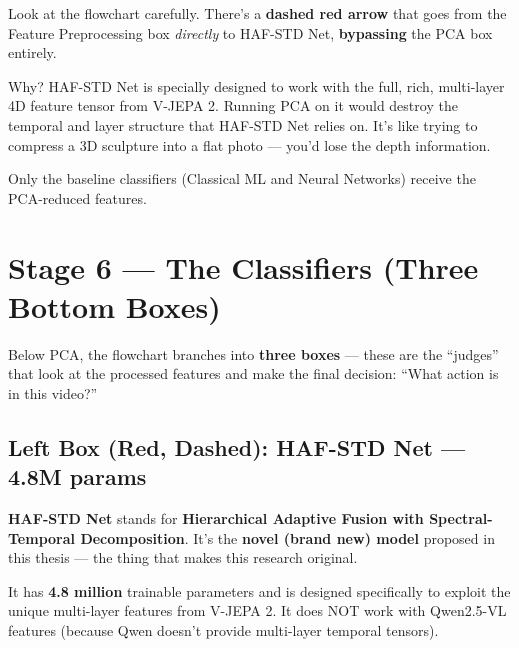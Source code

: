 \documentclass[12pt, a4paper]{article}
\begin{document}
\begin{warnbox}
Look at the flowchart carefully. There's a \textbf{dashed red arrow} that goes from the Feature Preprocessing box \textit{directly} to HAF-STD Net, \textbf{bypassing} the PCA box entirely. 

Why? HAF-STD Net is specially designed to work with the full, rich, multi-layer 4D feature tensor from V-JEPA 2. Running PCA on it would destroy the temporal and layer structure that HAF-STD Net relies on. It's like trying to compress a 3D sculpture into a flat photo — you'd lose the depth information.

Only the baseline classifiers (Classical ML and Neural Networks) receive the PCA-reduced features.
\end{warnbox}

\newpage
\section{Stage 6 — The Classifiers (Three Bottom Boxes)}

Below PCA, the flowchart branches into \textbf{three boxes} — these are the ``judges'' that look at the processed features and make the final decision: ``What action is in this video?''

\subsection{Left Box (Red, Dashed): HAF-STD Net — 4.8M params}

\begin{keybox}
\textbf{HAF-STD Net} stands for \textbf{Hierarchical Adaptive Fusion with Spectral-Temporal Decomposition}. It's the \textbf{novel (brand new) model} proposed in this thesis — the thing that makes this research original.

It has \textbf{4.8 million} trainable parameters and is designed specifically to exploit the unique multi-layer features from V-JEPA 2. It does NOT work with Qwen2.5-VL features (because Qwen doesn't provide multi-layer temporal tensors).
\end{keybox}
\end{document}
